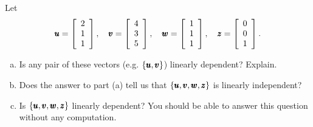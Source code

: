 \begin{example} Let
    \[
    \pmb{u} = \left[\begin{array}{l}
    2 \\
    1 \\
    1
    \end{array}\right], \quad \pmb{v} = \left[\begin{array}{l}
    4 \\
    3 \\
    5
    \end{array}\right], \quad \pmb{w} = \left[\begin{array}{l}
    1 \\
    1 \\
    1
    \end{array}\right], \quad \pmb{z} = \left[\begin{array}{l}
    0 \\
    0 \\
    1
    \end{array}\right].
    \]

    \begin{enumerate}[(a)]
        \item Is any pair of these vectors (e.g. $\{\pmb{u}, \pmb{v}\}$) linearly dependent? Explain.
        \item Does the answer to part (a) tell us that $\{\pmb{u}, \pmb{v}, \pmb{w}, \pmb{z}\}$ is linearly independent?
        \item Is $\{\pmb{u}, \pmb{v}, \pmb{w}, \pmb{z}\}$ linearly dependent? You should be able to answer this question without any computation.
    \end{enumerate}
\end{example}

